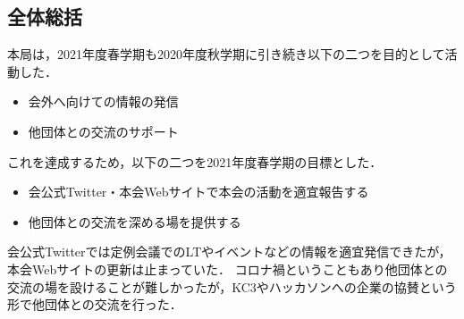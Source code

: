 \subsection*{全体総括}


本局は，2021年度春学期も2020年度秋学期に引き続き以下の二つを目的として活動した．
\begin{itemize}
\item 会外へ向けての情報の発信
\item 他団体との交流のサポート
\end{itemize}
これを達成するため，以下の二つを2021年度春学期の目標とした．
\begin{itemize}
\item 会公式Twitter・本会Webサイトで本会の活動を適宜報告する
\item 他団体との交流を深める場を提供する
\end{itemize}

会公式Twitterでは定例会議でのLTやイベントなどの情報を適宜発信できたが，本会Webサイトの更新は止まっていた．
コロナ禍ということもあり他団体との交流の場を設けることが難しかったが，KC3やハッカソンへの企業の協賛という形で他団体との交流を行った．
